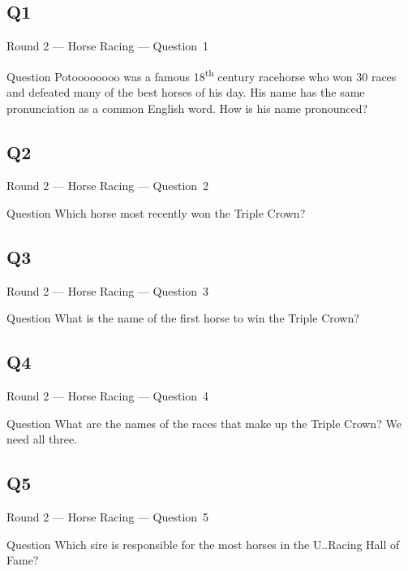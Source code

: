 \documentclass[11pt]{beamer}
\begin{document}
\subsection*{Q1}
\begin{frame}[t]{Round 2 --- Horse Racing --- \mbox{Question 1}}
\vspace{-0.5em}
\begin{block}{Question}
Potoooooooo was a famous 18\textsuperscript{th} century racehorse who won 30 races and defeated many of the best horses of his day. His name has the same pronunciation as a common English word. How is his name pronounced?
\end{block}
\end{frame}
\subsection*{Q2}
\begin{frame}[t]{Round 2 --- Horse Racing --- \mbox{Question 2}}
\vspace{-0.5em}
\begin{block}{Question}
Which horse most recently won the Triple Crown?
\end{block}
\end{frame}
\subsection*{Q3}
\begin{frame}[t]{Round 2 --- Horse Racing --- \mbox{Question 3}}
\vspace{-0.5em}
\begin{block}{Question}
What is the name of the first horse to win the Triple Crown?
\end{block}
\end{frame}
\subsection*{Q4}
\begin{frame}[t]{Round 2 --- Horse Racing --- \mbox{Question 4}}
\vspace{-0.5em}
\begin{block}{Question}
What are the names of the races that make up the Triple Crown? We need all three.
\end{block}
\end{frame}
\subsection*{Q5}
\begin{frame}[t]{Round 2 --- Horse Racing --- \mbox{Question 5}}
\vspace{-0.5em}
\begin{block}{Question}
Which sire is responsible for the most horses in the U.\@S.\@ Racing Hall of Fame?
\end{block}
\end{frame}
\end{document}
